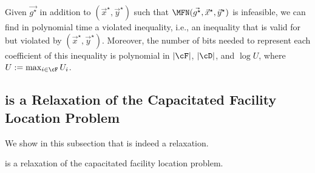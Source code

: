 \begin{lemma}
\label{lem:linprog}
Given $\vec{ g^{\star}}$ in addition to $(\vec x^{\star},\vec y^{\star})$ such that $\MFN(\vec{ g^{\star}},\vec x^{\star},\vec y^{\star})$ is infeasible, we can find in polynomial time a violated inequality, i.e., an inequality that is valid for \MFNLP but violated by $(\vec x^{\star},\vec y^{\star})$. Moreover, the number of bits needed to represent each coefficient of this inequality is polynomial in $|\cF|$, $|\cD|$, and $\log U$, where $U:=\max_{i\in\cF}U_i$.
\end{lemma}


\subsection{\MFNLP is a Relaxation of the Capacitated Facility Location Problem}

We show in this subsection that \MFNLP is indeed a relaxation.

\begin{lemma}
\MFNLP is a relaxation of the capacitated facility location problem.
\end{lemma}


